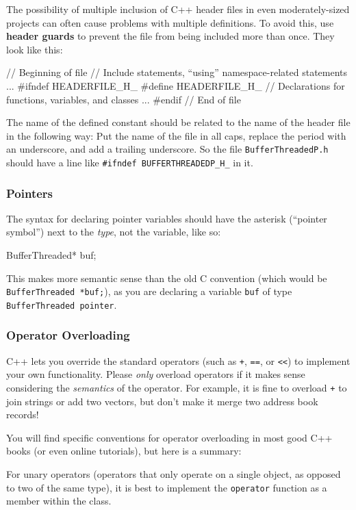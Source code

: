 \documentclass[12pt]{article}
\newcommand{\code}[1]{\texttt{#1}}
\newcommand{\textdef}[1]{\textbf{#1}}
\begin{document}
The possibility of multiple inclusion of C++ header files in even moderately-sized projects can often cause problems with multiple definitions. To avoid this, use \textdef{header guards} to prevent the file from being included more than once. They look like this:
\begin{codeex}
// Beginning of file
// Include statements, ``using'' namespace-related statements
...
#ifndef HEADERFILE_H_
#define HEADERFILE_H_
// Declarations for functions, variables, and classes
...
#endif
// End of file
\end{codeex}
The name of the defined constant should be related to the name of the header file in the following way: Put the name of the file in all caps, replace the period with an underscore, and add a trailing underscore. So the file \code{BufferThreadedP.h} should have a line like \code{\#ifndef BUFFERTHREADEDP\_H\_} in it.

\subsubsection{Pointers}
The syntax for declaring pointer variables should have the asterisk (``pointer symbol'') next to the \emph{type}, not the variable, like so:
\begin{codeex}
BufferThreaded* buf;
\end{codeex}
This makes more semantic sense than the old C convention (which would be \texttt{BufferThreaded *buf;}), as you are declaring a variable \texttt{buf} of type \texttt{BufferThreaded pointer}.

\subsubsection{Operator Overloading}
C++ lets you override the standard operators (such as \texttt{+}, \texttt{==}, or \texttt{<<}) to implement your own functionality. Please \emph{only} overload operators if it makes sense considering the \emph{semantics} of the operator. For example, it is fine to overload \texttt{+} to join strings or add two vectors, but don't make it merge two address book records!

You will find specific conventions for operator overloading in most good C++ books (or even online tutorials), but here is a summary:

For unary operators (operators that only operate on a single object, as opposed to two of the same type), it is best to implement the \texttt{operator} function as a member within the class.
\end{document}
